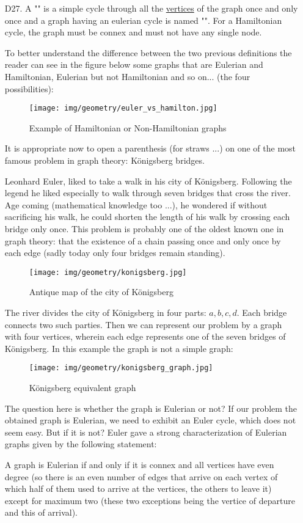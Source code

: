 {\begin{enumerate}
	\item[D27.] A "\label{hamiltonian cycle}" is a simple cycle through all the \underline{vertices} of the graph once and only once and a graph having an eulerian cycle is named "". For a Hamiltonian cycle, the graph must be connex and must not have any single node.
	
	To better understand the difference between the two previous definitions the reader can see in the figure below some graphs that are Eulerian and Hamiltonian, Eulerian but not Hamiltonian and so on... (the four possibilities):
	\begin{figure}[H]
		\centering
		\texttt{[image: img/geometry/euler\_vs\_hamilton.jpg]}
		\caption{Example of Hamiltonian or Non-Hamiltonian graphs}
	\end{figure}
	It is appropriate now to open a parenthesis (for straws ...) on one of the most famous problem in graph theory: Königsberg bridges.
	
	Leonhard Euler, liked to take a walk in his city of Königsberg. Following the legend he liked especially to walk through seven bridges that cross the river. Age coming (mathematical knowledge too ...), he wondered if without sacrificing his walk, he could shorten the length of his walk by crossing each bridge only once. This problem is probably one of the oldest known one in graph theory: that the existence of a chain passing once and only once by each edge (sadly today only four bridges remain standing).
	\begin{figure}[H]
		\centering
		\texttt{[image: img/geometry/konigsberg.jpg]}
		\caption{Antique map of the city of Königsberg}
	\end{figure}
	The river divides the city of Königsberg in four parts: $a, b, c, d$. Each bridge connects two such parties. Then we can represent our problem by a graph with four vertices, wherein each edge represents one of the seven bridges of Königsberg. In this example the graph is not a simple graph:
	\begin{figure}[H]
		\centering
		\texttt{[image: img/geometry/konigsberg\_graph.jpg]}
		\caption{Königsberg equivalent graph}
	\end{figure}
	The question here is whether the graph is Eulerian or not? If our problem the obtained graph is Eulerian, we need to exhibit an Euler cycle, which does not seem easy. But if it is not? Euler gave a strong characterization of Eulerian graphs given by the following statement:
	\begin{theorem}
	A graph is Eulerian if and only if it is connex and all vertices have even degree (so there is an even number of edges that arrive on each vertex of which half of them used to arrive at the vertices, the others to leave it) except for maximum two (these two exceptions being the vertice of departure and this of arrival).
	

\end{theorem}
\end{enumerate}}
